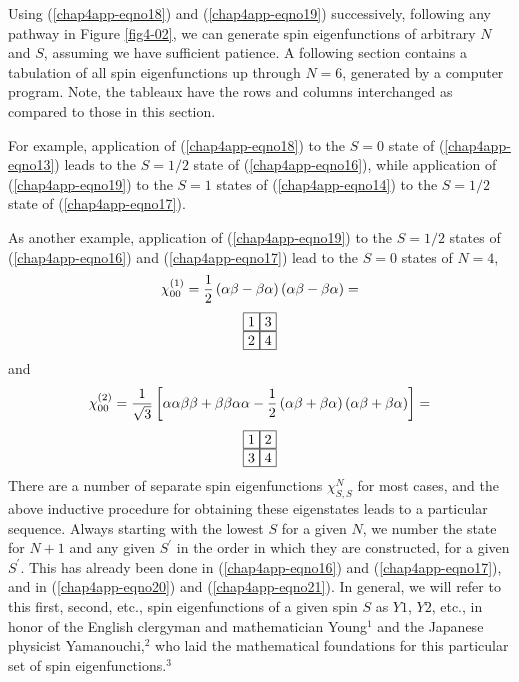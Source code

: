 Using (\ref{chap4app-eqno18}) and (\ref{chap4app-eqno19})
successively, following any pathway in Figure \ref{fig4-02}, we can
generate spin eigenfunctions of arbitrary $N$ and $S$, assuming we
have sufficient patience.  A following section contains a tabulation
of all spin eigenfunctions up through $N = 6$, generated by a computer
program.  Note, the tableaux have the rows and columns interchanged as
compared to those in this section.

For example, application of (\ref{chap4app-eqno18}) to the $S = 0$
state of (\ref{chap4app-eqno13}) leads to the $S = 1/2$ state of
(\ref{chap4app-eqno16}), while application of (\ref{chap4app-eqno19})
to the $S = 1$ states of (\ref{chap4app-eqno14}) to the $S = 1/2$
state of (\ref{chap4app-eqno17}).

As another example, application of (\ref{chap4app-eqno19}) to the $S =
1/2$ states of (\ref{chap4app-eqno16}) and (\ref{chap4app-eqno17})
lead to the $S = 0$ states of $N = 4$,
\begin{equation}
\chi^{(1)}_{00} = {1 \over 2} \left( \alpha \beta - \beta \alpha 
\right) \left( \alpha \beta - \beta \alpha \right) =
\label{chap4app-eqno20}
\end{equation}
\begin{equation}
\begin{tabular}{l}
\fbox{1}\fbox{3}\\
\fbox{2}\fbox{4}
\end{tabular}
\end{equation}
and
\begin{equation}
\chi^{(2)}_{00} = {1 \over \sqrt{3}} \left[ \alpha \alpha \beta 
\beta + \beta \beta \alpha \alpha - {1 \over 2} \left( \alpha \beta + 
\beta \alpha \right) \left( \alpha \beta + \beta \alpha \right) \right] 
=
\label{chap4app-eqno21}
\end{equation}
\begin{equation}
\begin{tabular}{l}
\fbox{1}\fbox{2}\\
\fbox{3}\fbox{4}
\end{tabular}
\end{equation}
\noindent
There are a number of separate spin eigenfunctions $\chi^N_{S,S}$ for
most cases, and the above inductive procedure for obtaining these
eigenstates leads to a particular sequence.  Always starting with the
lowest $S$ for a given $N$, we number the state for $N + 1$ and any
given $S^{\prime}$ in the order in which they are constructed, for a
given $S^{\prime}$.  This has already been done in
(\ref{chap4app-eqno16}) and (\ref{chap4app-eqno17}), and in
(\ref{chap4app-eqno20}) and (\ref{chap4app-eqno21}).  In general, we
will refer to this first, second, etc., spin eigenfunctions of a given
spin $S$ as $Y1$, $Y2$, etc., in honor of the English clergyman and
mathematician Young$^1$ and the Japanese physicist Yamanouchi,$^2$ who
laid the mathematical foundations for this particular set of spin
eigenfunctions.$^3$


